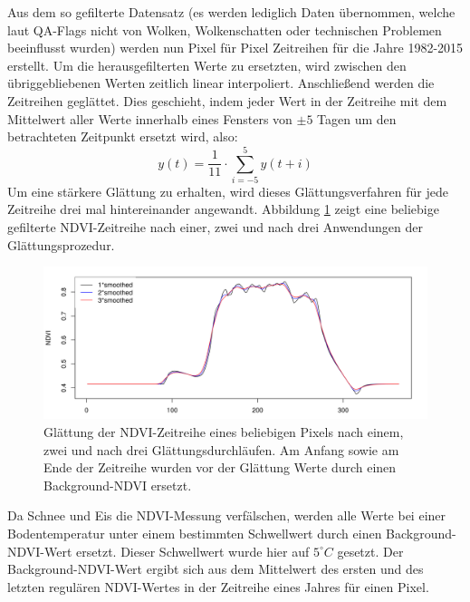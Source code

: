 \documentclass[]{article}
\begin{document}
Aus dem so gefilterte Datensatz (es werden lediglich Daten übernommen, welche laut QA-Flags nicht von Wolken, Wolkenschatten oder technischen Problemen beeinflusst wurden) werden nun Pixel für Pixel Zeitreihen für die Jahre 1982-2015 erstellt. Um die herausgefilterten Werte zu ersetzten, wird zwischen den übriggebliebenen Werten zeitlich linear interpoliert. Anschließend werden die Zeitreihen geglättet. Dies geschieht, indem jeder Wert in der Zeitreihe mit dem Mittelwert aller Werte innerhalb eines Fensters von $\pm 5$ Tagen um den betrachteten Zeitpunkt ersetzt wird, also:
\begin{equation}
y(t)=\frac{1}{11}\cdot \sum_{i=-5}^{5} y(t+i)
\end{equation}
Um eine stärkere Glättung zu erhalten, wird dieses Glättungsverfahren für jede Zeitreihe drei mal hintereinander angewandt. Abbildung \ref{smoothe} zeigt eine beliebige gefilterte NDVI-Zeitreihe nach einer, zwei und nach drei Anwendungen der Glättungsprozedur. 

\begin{figure}
  \includegraphics[width=1.\textwidth]{smoothe.png}
	\caption{Glättung der NDVI-Zeitreihe eines beliebigen Pixels nach einem, zwei und nach drei Glättungsdurchläufen. Am Anfang sowie am Ende der Zeitreihe wurden vor der Glättung Werte durch einen Background-NDVI ersetzt.}
	\label{smoothe}
\end{figure}

Da Schnee und Eis die NDVI-Messung verfälschen, werden alle Werte bei einer Bodentemperatur unter einem bestimmten Schwellwert durch einen Background-NDVI-Wert ersetzt. Dieser Schwellwert wurde hier auf $5^\circ C$ gesetzt. Der Background-NDVI-Wert ergibt sich aus dem Mittelwert des ersten und des letzten regulären NDVI-Wertes in der Zeitreihe eines Jahres für einen Pixel.
\end{document}

